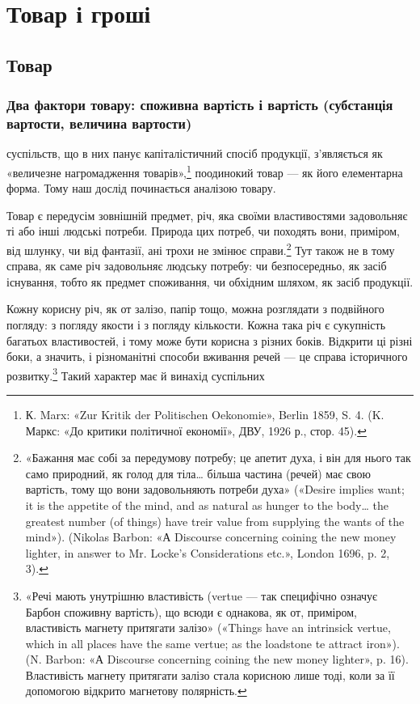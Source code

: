 \chapter{Товар і гроші}
\section{Товар}
\subsection{Два фактори товару: споживна вартість і вартість (субстанція
вартости, величина вартости)}

\lettrine[lines=3, loversize=0.1, lhang=0.15]{}{} суспільств, що в них панує капіталістичний спосіб
продукції, з’являється як «величезне нагромадження товарів»,\footnote{
К. Marx: «Zur Kritik der Politischen Oekonomie», Berlin 1859,
S. 4. (K. Маркс: «До критики політичної економії», ДВУ, 1926 р.,
стор. 45).
}
поодинокий товар — як його елементарна форма. Тому наш
дослід починається аналізою товару.

Товар є передусім зовнішній предмет, річ, яка своїми властивостями
задовольняє ті або інші людські потреби. Природа цих
потреб, чи походять вони, приміром, від шлунку, чи від фантазії,
ані трохи не змінює справи.\footnote{
«Бажання має собі за передумову потребу; це апетит духа, і він
для нього так само природний, як голод для тіла\dots{} більша частина (речей)
має свою вартість, тому що вони задовольняють потреби духа» («Desire
implies want; it is the appetite of the mind, and as natural as hunger to
the body\dots{} the greatest number (of things) have treir value from supplying
the wants of the mind»). (Nikolas Barbon: «А Discourse concerning coining
the new money lighter, in answer to Mr. Locke’s Considerations
etc.», London 1696, p. 2, 3).
} Тут також не в тому справа, як саме
річ задовольняє людську потребу: чи безпосередньо, як засіб
існування, тобто як предмет споживання, чи обхідним шляхом,
як засіб продукції.

Кожну корисну річ, як от залізо, папір тощо, можна розглядати
з подвійного погляду: з погляду якости і з погляду кількости.
Кожна така річ є сукупність багатьох властивостей, і тому
може бути корисна з різних боків. Відкрити ці різні боки, а значить,
і різноманітні способи вживання речей — це справа історичного
розвитку.\footnote{
«Речі мають унутрішню властивість (vertue — так специфічно
означує Барбон споживну вартість), що всюди є однакова, як от, приміром,
властивість магнету притягати залізо» («Things have an intrinsick vertue,
which in all places have the same vertue; as the loadstone te attract iron»).
(N. Barbon: «А Discourse concerning coining the new money lighter»,
p. 16). Властивість магнету притягати залізо стала корисною лише тоді,
коли за її допомогою відкрито магнетову полярність.
} Такий характер має й винахід суспільних
\parbreak{}  %
